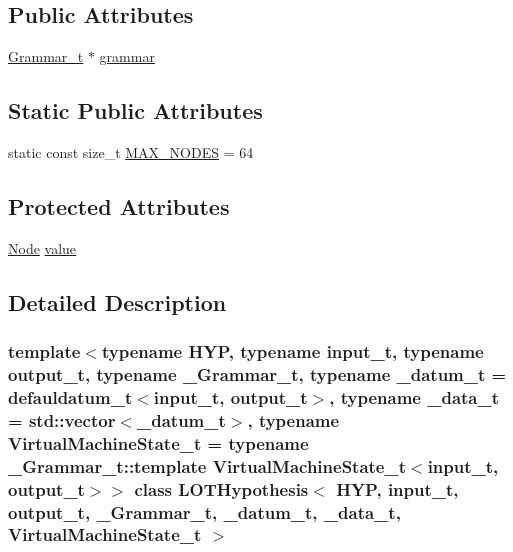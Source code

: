\subsection*{Public Attributes}
\begin{DoxyCompactItemize}
\item 
\hyperlink{class_l_o_t_hypothesis_a8006204013d471860e54c49d19edbace}{Grammar\+\_\+t} $\ast$ \hyperlink{class_l_o_t_hypothesis_affae32db28c39df676809ae47e14e7cf}{grammar}
\end{DoxyCompactItemize}
\subsection*{Static Public Attributes}
\begin{DoxyCompactItemize}
\item 
static const size\+\_\+t \hyperlink{class_l_o_t_hypothesis_a0231650d938c098118a4c4bdb201fc61}{M\+A\+X\+\_\+\+N\+O\+D\+ES} = 64
\end{DoxyCompactItemize}
\subsection*{Protected Attributes}
\begin{DoxyCompactItemize}
\item 
\hyperlink{class_node}{Node} \hyperlink{class_l_o_t_hypothesis_ac759b3eab77ead1749b905a3dde74961}{value}
\end{DoxyCompactItemize}


\subsection{Detailed Description}
\subsubsection*{template$<$typename H\+YP, typename input\+\_\+t, typename output\+\_\+t, typename \+\_\+\+Grammar\+\_\+t, typename \+\_\+datum\+\_\+t = defauldatum\+\_\+t$<$input\+\_\+t, output\+\_\+t$>$, typename \+\_\+data\+\_\+t = std\+::vector$<$\+\_\+datum\+\_\+t$>$, typename Virtual\+Machine\+State\+\_\+t = typename \+\_\+\+Grammar\+\_\+t\+::template Virtual\+Machine\+State\+\_\+t$<$input\+\_\+t, output\+\_\+t$>$$>$\newline
class L\+O\+T\+Hypothesis$<$ H\+Y\+P, input\+\_\+t, output\+\_\+t, \+\_\+\+Grammar\+\_\+t, \+\_\+datum\+\_\+t, \+\_\+data\+\_\+t, Virtual\+Machine\+State\+\_\+t $>$}

